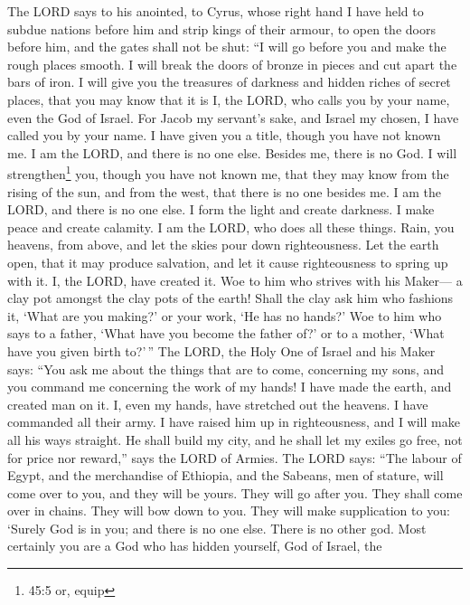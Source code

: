  The LORD says to his anointed, to Cyrus, whose right hand I
have held to subdue nations before him and strip kings of their armour,
to open the doors before him, and the gates shall not be shut:
 ``I will go before you and make the rough places smooth. I
will break the doors of bronze in pieces and cut apart the bars of iron.
 I will give you the treasures of darkness and hidden riches
of secret places, that you may know that it is I, the LORD, who calls
you by your name, even the God of Israel.  For Jacob my
servant's sake, and Israel my chosen, I have called you by your name. I
have given you a title, though you have not known me.  I am
the LORD, and there is no one else. Besides me, there is no God. I will
strengthen\footnote{45:5 or, equip} you, though you have not known me,
 that they may know from the rising of the sun, and from the
west, that there is no one besides me. I am the LORD, and there is no
one else.  I form the light and create darkness. I make
peace and create calamity. I am the LORD, who does all these things.
 Rain, you heavens, from above, and let the skies pour down
righteousness. Let the earth open, that it may produce salvation, and
let it cause righteousness to spring up with it. I, the LORD, have
created it.  Woe to him who strives with his Maker--- a clay
pot amongst the clay pots of the earth! Shall the clay ask him who
fashions it, `What are you making?' or your work, `He has no hands?'
 Woe to him who says to a father, `What have you become the
father of?' or to a mother, `What have you given birth to?'\,''
 The LORD, the Holy One of Israel and his Maker says: ``You
ask me about the things that are to come, concerning my sons, and you
command me concerning the work of my hands!  I have made
the earth, and created man on it. I, even my hands, have stretched out
the heavens. I have commanded all their army.  I have
raised him up in righteousness, and I will make all his ways straight.
He shall build my city, and he shall let my exiles go free, not for
price nor reward,'' says the LORD of Armies.  The LORD
says: ``The labour of Egypt, and the merchandise of Ethiopia, and the
Sabeans, men of stature, will come over to you, and they will be yours.
They will go after you. They shall come over in chains. They will bow
down to you. They will make supplication to you: `Surely God is in you;
and there is no one else. There is no other god.  Most
certainly you are a God who has hidden yourself, God of Israel, the
